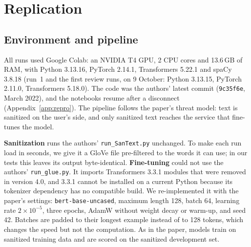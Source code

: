 \documentclass[11pt]{article}
\begin{document}
\section{Replication}
\label{sec:replication}

\subsection{Environment and pipeline}
All runs used Google Colab: an NVIDIA T4 GPU, 2 CPU cores and 13.6\,GB of RAM, with Python 3.13.16, PyTorch 2.14.1, Transformers 5.22.1 and spaCy 3.8.18 (run~1 and the first review runs, on 9 October: Python 3.13.15, PyTorch 2.11.0, Transformers 5.18.0). The code was the authors' latest commit (\texttt{9c35f6e}, March 2022), and the notebooks resume after a disconnect (Appendix~\ref{app:repro}). The pipeline follows the paper's threat model: text is sanitized on the user's side, and only sanitized text reaches the service that fine-tunes the model.

\textbf{Sanitization} runs the authors' \texttt{run\_SanText.py} unchanged. To make each run load in seconds, we give it a GloVe file pre-filtered to the words it can use; in our tests this leaves its output byte-identical. \textbf{Fine-tuning} could not use the authors' \texttt{run\_glue.py}. It imports Transformers 3.3.1 modules that were removed in version 4.0, and 3.3.1 cannot be installed on a current Python because its tokenizer dependency has no compatible build. We re-implemented it with the paper's settings: \texttt{bert-base-uncased}, maximum length 128, batch 64, learning rate $2\times10^{-5}$, three epochs, AdamW without weight decay or warm-up, and seed 42. Batches are padded to their longest example instead of to 128 tokens, which changes the speed but not the computation. As in the paper, models train on sanitized training data and are scored on the sanitized development set.
\end{document}
